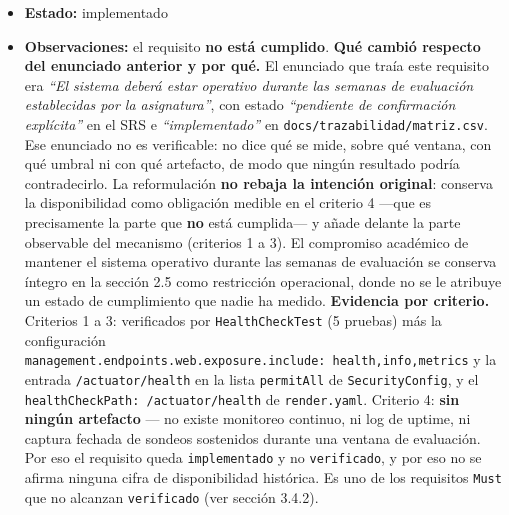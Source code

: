 \documentclass[
  spanish,
]{article}
\begin{document}
\begin{itemize}
  healthcheck del despliegue definido en \texttt{render.\allowbreak{}yaml} y
  documentado en \texttt{docs/\allowbreak{}despliegue/\allowbreak{}DEPLOYMENT.\allowbreak{}md} y
  \texttt{docs/\allowbreak{}despliegue/\allowbreak{}RUNBOOK.\allowbreak{}md}; objetivo \texttt{up} del
  \texttt{Makefile} y \texttt{docker-\allowbreak{}compose.\allowbreak{}yml}; restricción
  operacional correspondiente en la sección 2.5.
\item
  \textbf{Estado:} implementado
\item
  \textbf{Observaciones:} el requisito \textbf{no está cumplido}.
  \textbf{Qué cambió respecto del enunciado anterior y por qué.} El
  enunciado que traía este requisito era \emph{``El sistema deberá estar
  operativo durante las semanas de evaluación establecidas por la
  asignatura''}, con estado \emph{``pendiente de confirmación
  explícita''} en el SRS e \emph{``implementado''} en
  \texttt{docs/\allowbreak{}trazabilidad/\allowbreak{}matriz.\allowbreak{}csv}. Ese enunciado no es
  verificable: no dice qué se mide, sobre qué ventana, con qué umbral ni
  con qué artefacto, de modo que ningún resultado podría contradecirlo.
  La reformulación \textbf{no rebaja la intención original}: conserva la
  disponibilidad como obligación medible en el criterio 4 ---que es
  precisamente la parte que \textbf{no} está cumplida--- y añade delante
  la parte observable del mecanismo (criterios 1 a 3). El compromiso
  académico de mantener el sistema operativo durante las semanas de
  evaluación se conserva íntegro en la sección 2.5 como restricción
  operacional, donde no se le atribuye un estado de cumplimiento que
  nadie ha medido. \textbf{Evidencia por criterio.} Criterios 1 a 3:
  verificados por \texttt{Health\allowbreak{}Check\allowbreak{}Test} (5 pruebas) más la
  configuración
  \texttt{management.\allowbreak{}endpoints.\allowbreak{}web.\allowbreak{}exposure.\allowbreak{}include:\ health,\allowbreak{}info,\allowbreak{}metrics}
  y la entrada \texttt{/\allowbreak{}actuator/\allowbreak{}health} en la lista \texttt{permit\allowbreak{}All}
  de \texttt{Security\allowbreak{}Config}, y el
  \texttt{health\allowbreak{}Check\allowbreak{}Path:\ /\allowbreak{}actuator/\allowbreak{}health} de \texttt{render.\allowbreak{}yaml}.
  Criterio 4: \textbf{sin ningún artefacto} --- no existe monitoreo
  continuo, ni log de uptime, ni captura fechada de sondeos sostenidos
  durante una ventana de evaluación. Por eso el requisito queda
  \texttt{implementado} y no \texttt{verificado}, y por eso no se afirma
  ninguna cifra de disponibilidad histórica. Es uno de los requisitos
  \texttt{Must} que no alcanzan \texttt{verificado} (ver sección 3.4.2).
\end{itemize}
\end{document}

